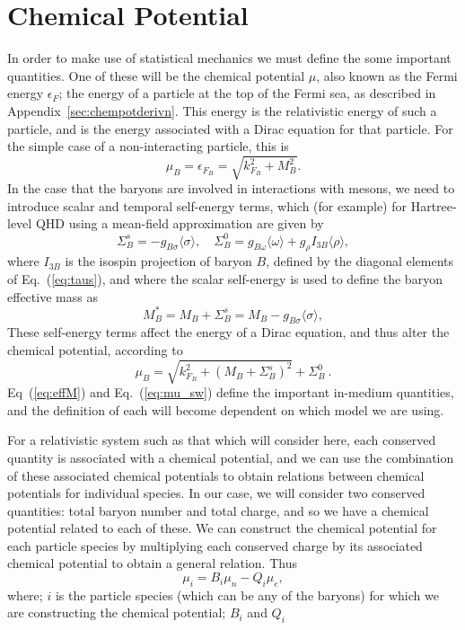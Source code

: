 \documentclass[11pt,a4paper,twoside]{carrollthesis}
\newcommand{\be}{\begin{equation}}
\newcommand{\ee}{\end{equation}}
\newcommand{\bra}{\langle}
\newcommand{\ket}{\rangle}
\newcommand{\s}{\sigma}
\newcommand{\w}{\omega}
\begin{document}
\section{Chemical Potential}\label{sec:qftchempot}
%
In order to make use of statistical mechanics we must define the some
important quantities. One of these will be the chemical potential
$\mu$, also known as the Fermi energy $\epsilon_{F}$; the energy of a
particle at the top of the Fermi sea, as described in
Appendix~\ref{sec:chempotderivn}. This energy is the relativistic
energy of such a particle, and is the energy associated with a Dirac
equation for that particle. For the simple case of a non-interacting
particle, this is
%
\be \label{eq:muepsf} \mu_B = \epsilon_{F_B} = \sqrt{k_{F_B}^2 +
  M_B^2}. \ee
%
In the case that the baryons are involved in interactions with mesons,
we need to introduce scalar and temporal self-energy terms, which (for
example) for Hartree-level QHD using a mean-field approximation are
given by
%
\be \label{eq:selfenergy}
\Sigma^s_B = - g_{B\s} \bra\s\ket,\quad \Sigma^0_B = g_{B\w}\bra\w\ket
+ g_{\rho}I_{3B}\bra\rho\ket,
\ee
%
where $I_{3B}$ is the isospin projection of baryon $B$, defined by the
diagonal elements of Eq.~(\ref{eq:taus}), and where the scalar
self-energy is used to define the baryon effective mass as
%
\be \label{eq:effM}
M_B^* = M_B + \Sigma^s_B = M_B - g_{B\s} \bra\s\ket,
\ee
%
These self-energy terms affect the energy of a Dirac equation, and
thus alter the chemical potential, according to
%
\be
\label{eq:mu_sw}
\mu_B = \sqrt{k_{F_B}^2 + (M_B + \Sigma^s_B)^2}+\Sigma_B^0\ .  \ee
%
Eq~(\ref{eq:effM}) and Eq.~(\ref{eq:mu_sw}) define the important
in-medium quantities, and the definition of each will become
dependent on which model we are using.\par
%
For a relativistic system such as that which will consider here, each
conserved quantity is associated with a chemical potential, and we can
use the combination of these associated chemical potentials to obtain
relations between chemical potentials for individual species. In our
case, we will consider two conserved quantities: total baryon number
and total charge, and so we have a chemical potential related to each
of these. We can construct the chemical potential for each particle
species by multiplying each conserved charge by its associated
chemical potential to obtain a general relation. Thus
%
\be \label{eq:chempotrel} \mu_i = B_i \mu_n - Q_i \mu_e, \ee
%
where; $i$ is the particle species (which can be any of the baryons)
for which we are constructing the chemical potential; $B_i$ and $Q_i$
\end{document}
